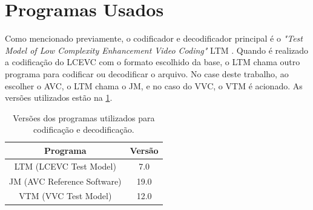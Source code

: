 \section{Programas Usados}

Como mencionado previamente, o codificador e decodificador principal é o \textit{"Test Model of Low 
Complexity Enhancement Video Coding"} LTM \cite{ltm_git}. Quando é realizado a codificação do LCEVC com o formato
escolhido da base, o LTM chama outro programa para codificar ou decodificar o arquivo. No case deste
trabalho, ao escolher o \acrshort{AVC}, o LTM chama o JM, e no caso do \acrshort{VVC}, o VTM é acionado.
As versões utilizados estão na \ref{tab:program_versions}.

\begin{table}[h]
    \centering
    \begin{tabular}{|c|c|}
        \hline
        \textbf{Programa} & \textbf{Versão} \\
        \hline
        LTM (LCEVC Test Model) & 7.0 \\
        JM (AVC Reference Software) & 19.0 \\
        VTM (VVC Test Model) & 12.0 \\
        \hline
    \end{tabular}
    \caption{Versões dos programas utilizados para codificação e decodificação.}
    \label{tab:program_versions}
\end{table}